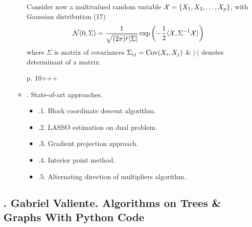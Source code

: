 \documentclass{article}
\begin{document}
\begin{itemize}
\begin{itemize}
        Consider now a multivalued random variable ${\cal X} = \{X_1,X_2,\ldots,X_p\}$, with Gaussian distribution (17)
        \begin{equation*}
            {\cal N}(0,\Sigma) = \frac{1}{\sqrt{(2\pi)^p|\Sigma|}}\exp\left(-\frac{1}{2}\langle{\cal X},\Sigma^{-1}{\cal X}\rangle\right)
        \end{equation*}
        where $\Sigma$ is matrix of covariances $\Sigma_{ij} = {\rm Cov}(X_i,X_j)$ \& $|\cdot|$ denotes determinant of a matrix.
        
        p. 10+++
        
        \item {. State-of-art approaches.}
        \begin{itemize}
            \item {.1. Block coordinate descent algorithm.}
            \item {.2. LASSO estimation on dual problem.}
            \item {.3. Gradient projection approach.}
            \item {.4. Interior point method.}
            \item {.5. Alternating direction of multipliers algorithm.}
        \end{itemize}
    \end{itemize}
\end{itemize}


\subsection{\cite{Valiente2002, Valiente2021}. {\sc Gabriel Valiente}. Algorithms on Trees \& Graphs With Python Code}
\end{document}
